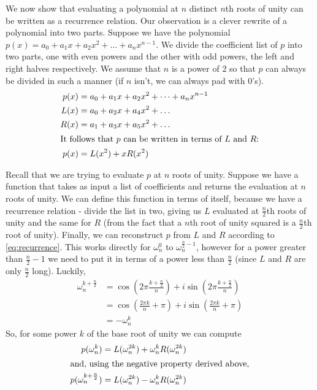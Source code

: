 \documentclass[11pt, oneside]{article}
\theoremstyle{plain}
\theoremstyle{definition}
\begin{document}
We now show that evaluating a polynomial at \( n \) distinct \( n \)th roots of
unity can be written as a recurrence relation. Our observation is a clever
rewrite of a polynomial into two parts. Suppose we have the polynomial
\( p(x) = a_0 + a_1 x + a_2 x^2 + \dots + a_n x^{n - 1} \). We divide the
coefficient list of \( p \) into two parts,
one with even powers and the other with odd powers,
the left and right halves respectively.
We assume that \( n \) is a power of 2 so that \( p \) can always be divided
in such a manner (if \( n \) isn't, we can always pad with 0's).
\begin{align}
  p(x) &= a_0 + a_1 x + a_2 x^2 + \dots + a_n x^{n - 1} \\
  L(x) &= a_0 + a_2 x + a_4 x^2 + \dots \\
  R(x) &= a_1 + a_3 x + a_5 x^2 + \dots \\
  \shortintertext{It follows that \( p \) can be written
  in terms of \( L \) and \( R \):}
  p(x) &= L(x^2) + x R(x^2) \label{eq:recurrence} 
\end{align}

Recall that we are trying to evaluate \( p \) at \( n \) roots of unity.
Suppose we have a function that takes as input a list of coefficients
and returns the evaluation at \( n \) roots of unity.
We can define this function in terms of itself, because we have a recurrence
relation - divide the list in two, giving us \( L \) evaluated at 
\( \frac{n}{2} \)th roots of unity and the same for \( R \)
(from the fact that a \( n \)th root of unity squared is a \( \frac{n}{2} \)th
root of unity). Finally, we can reconstruct \( p \) from \( L \) and \( R \)
according to \eqref{eq:recurrence}. This works directly for \( \omega^0_n \)
to \( \omega^{\frac{n}{2} - 1}_n \), however for a power greater than
\( \frac{n}{2} - 1 \) we need to put it in terms of a power less than
\( \frac{n}{2} \) (since \( L \) and \( R \) are only \( \frac{n}{2} \) long).
Luckily, 
\begin{align*}
  \omega^{k + \frac{n}{2}}_n &= \cos(2 \pi \frac{k + \frac{n}{2}}{n}) +
  i \sin(2 \pi \frac{k + \frac{n}{2}}{n}) \\
                             &= \cos(\frac{2 \pi k}{n} + \pi) +
                             i \sin(\frac{2 \pi k}{n} + \pi) \\
                             &= -\omega_n^k
\end{align*}
So, for some power \( k \) of the base root of unity we can compute
\begin{align*}
  p(\omega^k_n) &= L(\omega^{2k}_n) + \omega^k_n R(\omega^{2k}_n) \\
  \shortintertext{and, using the negative property derived above,}
  p(\omega^{k + \frac{n}{2}}_n) &= L(\omega^{2k}_n) - \omega^k_n R(\omega^{2k}_n) \\
\end{align*}
\end{document}
